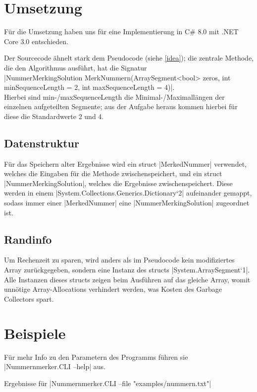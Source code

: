 \documentclass[a4paper,10pt,ngerman]{scrartcl}
\begin{document}
\section{Umsetzung}

Für die Umsetzung haben uns für eine Implementierung in C\# 8.0 mit
.NET Core 3.0 entschieden.

Der Sourcecode ähnelt stark dem Pseudocode (siehe \cref{idea});
die zentrale Methode, die den Algorithmus ausführt, hat die Signatur\\
|NummerMerkingSolution MerkNummern(ArraySegment<bool> zeros, int minSequenceLength = 2, int maxSequenceLength = 4)|.\\
Hierbei sind min-/maxSequenceLength die Minimal-/Maximallängen
der einzelnen aufgeteilten Segmente; aus der Aufgabe heraus kommen hierbei
für diese die Standardwerte 2 und 4.

\subsection{Datenstruktur}

Für das Speichern alter Ergebnisse wird ein struct |MerkedNummer|
verwendet, welches die Eingaben für die Methode zwischenspeichert,
und ein struct |NummerMerkingSolution|, welches die Ergebnisse
zwischenspeichert. Diese werden in einem
|System.Collections.Generics.Dictionary`2| aufeinander gemappt,
sodass immer einer |MerkedNummer| eine |NummerMerkingSolution|
zugeordnet ist.

\subsection{Randinfo}

Um Rechenzeit zu sparen, wird anders als im Pseudocode kein modifiziertes
Array zurückgegeben, sondern eine Instanz des structs |System.ArraySegment`1|.
Alle Instanzen dieses structs zeigen beim Ausführen auf das gleiche Array,
womit unnötige Array-Allocations verhindert werden, was Kosten des
Garbage Collectors spart.

\section{Beispiele}

Für mehr Info zu den Parametern des Programms führen sie |Nummernmerker.CLI --help| aus.

Ergebnisse für |Nummernmerker.CLI --file "examples/nummern.txt"|
\end{document}
